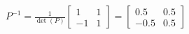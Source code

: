 \documentclass[preview]{standalone}
\begin{document}
\begin{align*}
P^{-1} = \frac{1}{\det(P)} \begin{bmatrix} 1 & 1 \\ -1 & 1 \end{bmatrix} = \begin{bmatrix} 0.5 & 0.5 \\ -0.5 & 0.5 \end{bmatrix}
\end{align*}
\end{document}
